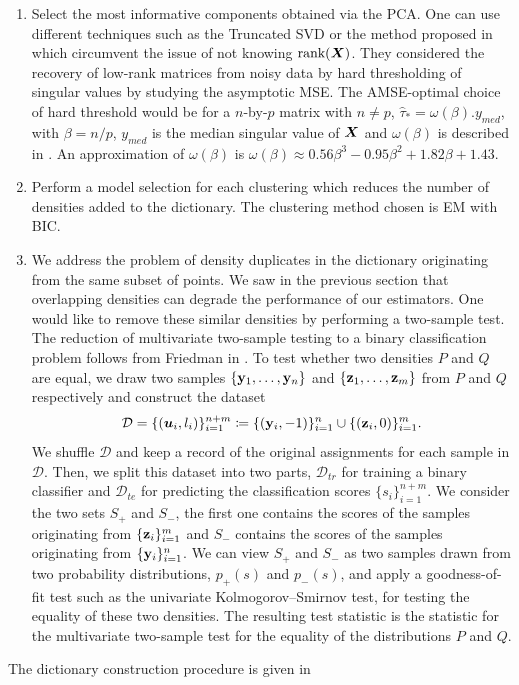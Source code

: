 \begin{enumerate}
  \item Select the most informative components obtained via the PCA. One can use different techniques such as the Truncated SVD or the method proposed in \citep{Gavish2014} which circumvent the issue of not knowing $\textnormal{rank}(\boldsymbol X)$. They considered the recovery of low-rank matrices from noisy data by hard thresholding of singular values by studying the asymptotic MSE. The AMSE-optimal choice of hard threshold would be for a $n$-by-$p$ matrix with $n\neq p$, $\hat\tau_* = \omega(\beta).y_{med}$, with $\beta = n/p$, $y_{med}$ is the median singular value of $\boldsymbol X$ and $\omega(\beta)$ is described in \citep{Gavish2014}. An approximation of $\omega(\beta)$ is $\omega(\beta) \approx 0.56\beta^3 - 0.95\beta^2 + 1.82\beta + 1.43$. 
  \item Perform a model selection for each clustering which reduces the number of densities added to the dictionary. The clustering method chosen is EM with BIC. 
  \item We address the problem of density duplicates in the dictionary originating from the same subset of points. We saw in the previous section that overlapping densities can degrade the performance of our estimators. One would like to remove these similar densities by performing a two-sample test. The reduction of multivariate two-sample testing to a binary classification problem follows from Friedman in \citep{Friedman:2003id}. To test whether two densities $P$ and $Q$ are equal, we draw two samples $\{\mathbf y_1,\dots,\mathbf y_n\}$ and $\{\mathbf z_1,\dots,\mathbf z_m\}$ from $P$ and $Q$ respectively and construct the dataset
\begin{equation}
  \mathcal{D} = \{(\boldsymbol u_i,l_i)\}_{i=1}^{n+m}  \coloneqq  \{(\mathbf y_i,-1)\}_{i=1}^n \cup \{(\mathbf z_i,0)\}_{i=1}^m.
\end{equation}
We shuffle $\mathcal{D}$ and keep a record of the original assignments for each sample in $\mathcal{D}$. Then, we split this dataset into two parts, $\mathcal{D}_{tr}$ for training a binary classifier and $\mathcal{D}_{te}$ for predicting the classification scores $\{s_i\}_{i=1}^{n+m}$. We consider the two sets $S_+$ and $S_-$, the first one contains the scores of the samples originating from $\{\mathbf z_i\}_{i=1}^m$ and $S_-$ contains the scores of the samples originating from $\{\mathbf y_i\}_{i=1}^n$. We can view $S_+$ and $S_-$ as two samples drawn from two probability distributions, $p_+(s)$ and $p_-(s)$, and  apply a goodness-of-fit test such as the univariate Kolmogorov–Smirnov test, for testing the equality of these two densities. The resulting test statistic is the statistic for the multivariate two-sample test for the equality of the distributions $P$ and $Q$. 
\end{enumerate}
The dictionary construction procedure is given in 

